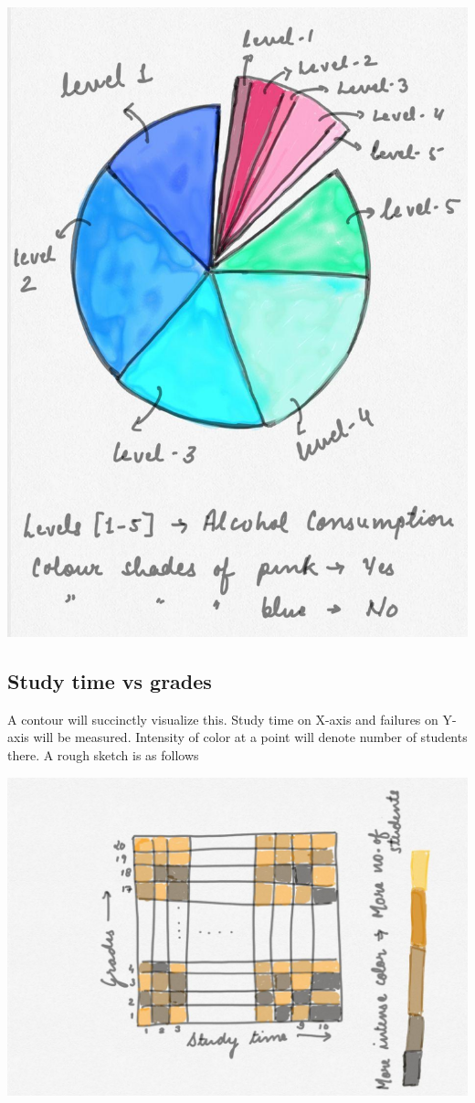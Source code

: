 \documentclass[titlepage, 12pt]{article}
\begin{document}
\begin{center}
\includegraphics[scale=0.3]{2}
\end{center}

\subsection{Study time vs grades}
A contour will succinctly visualize this. Study time on X-axis and failures
on Y-axis will be measured. Intensity of color at a point will denote number of
students there. A rough sketch is as follows

\begin{center}
\includegraphics[scale=0.3]{3}
\end{center}
\end{document}
